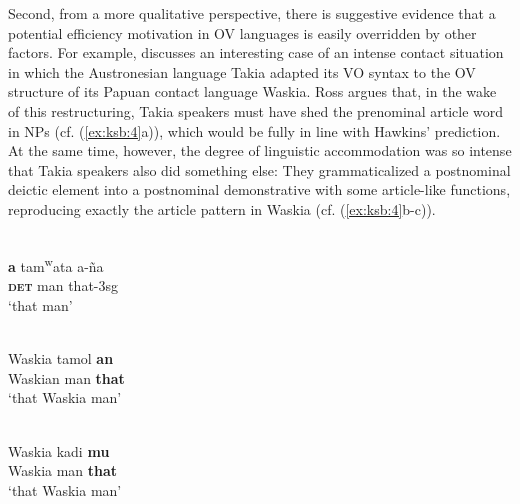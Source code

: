 \documentclass[output=paper]{langsci/langscibook}
\begin{document}
Second, from a more qualitative perspective, there is suggestive evidence that a potential efficiency motivation in OV languages is easily overridden by other factors. For example, \citet{Ross2001} discusses an interesting case of an intense contact situation in which the Austronesian language Takia adapted its VO syntax to the OV structure of its Papuan contact language Waskia. Ross argues that, in the wake of this restructuring, Takia speakers must have shed the prenominal article word in NPs (cf. (\ref{ex:ksb:4}a)), which would be fully in line with Hawkins’ prediction. At the same time, however, the degree of linguistic accommodation was so intense that Takia speakers also did something else: They grammaticalized a postnominal deictic element into a postnominal demonstrative with some article-like functions, reproducing exactly the article pattern in Waskia (cf. (\ref{ex:ksb:4}b-c)).

\ea\label{ex:ksb:4} 
  \ea
  \\
  \gll \textbf{a}   tam\textsuperscript{w}ata   a-ña\\
      \textbf{\textsc{det}}   man   that-3sg\\
  \glt ‘that man’

  \ex 
  \\
  \gll Waskia   tamol  \textbf{an}\\
      Waskian   man   \textbf{that}\\
  \glt ‘that Waskia man’

  \ex
  \\
  \gll Waskia   kadi   \textbf{mu}\\
      Waskia   man   \textbf{that}\\
  \glt ‘that Waskia man’
  \z
\z
\end{document}
